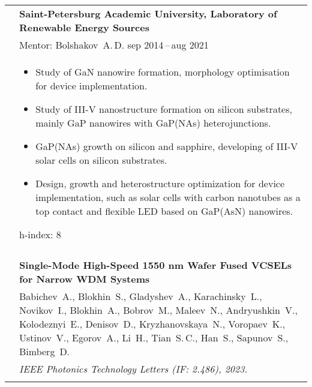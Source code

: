 \documentclass[letterpaper, 11pt]{article}
\begin{document}
\begin{longtable}{p{1.3in}p{4.8in}}
		
		\nohyphens{\color{OliveGreen}{Research experience}}
        & \textbf{Saint-Petersburg Academic University, Laboratory of Renewable
        Energy Sources} \\
		& Mentor: Bolshakov~A.\,D. \hfill sep 2014\,--\,aug 2021 \\
        &
		\begin{itemize}
            \item Study of GaN nanowire formation, morphology optimisation for
                device implementation.
            \item Study of III-V nanostructure formation on silicon substrates,
                mainly GaP nanowires with GaP(NAs) heterojunctions.
            \item GaP(NAs) growth on silicon and sapphire, developing of III-V
                solar cells on silicon substrates.
            \item Design, growth and heterostructure optimization for device
                implementation, such as solar cells with carbon nanotubes as a
                top contact and flexible LED based on GaP(AsN) nanowires.
		\end{itemize}
		
		h-index: 8 \\
		& \\
		
		
		
		
		\nohyphens{\color{OliveGreen}{Q1 Publications}}
        & \textbf{Single-Mode High-Speed 1550 nm Wafer Fused VCSELs for Narrow
        WDM Systems} \\
        & Babichev~A., Blokhin~S., Gladyshev~A., Karachinsky~L., Novikov~I.,
        Blokhin~A., Bobrov~M., Maleev~N., Andryushkin~V., Kolodeznyi~E.,
        Denisov~D., Kryzhanovskaya~N., Voropaev~K., Ustinov~V., Egorov~A.,
        Li~H., Tian~S.\,C., Han~S., Sapunov~S., Bimberg~D.
        \\
        & \textit{IEEE Photonics Technology Letters (IF: 2.486), 2023.}\\
		& \\


\end{longtable}
\end{document}
